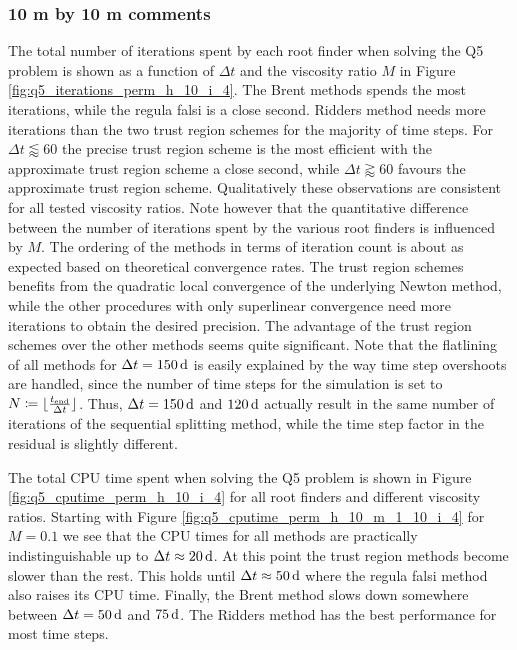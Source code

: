 \subsubsection{10 m by 10 m comments}
The total number of iterations spent by each root finder when solving the Q5 problem is shown as a function of $\Delta t$ and the viscosity ratio $M$ in Figure \ref{fig:q5_iterations_perm_h_10_i_4}. The Brent methods spends the most iterations, while the regula falsi is a close second. Ridders method needs more iterations than the two trust region schemes for the majority of time steps. For $\Delta t \lessapprox 60$ the precise trust region scheme is the most efficient with the approximate trust region scheme a close second, while $\Delta t \gtrapprox 60$ favours the approximate trust region scheme. Qualitatively these observations are consistent for all tested viscosity ratios. Note however that the quantitative difference between the number of iterations spent by the various root finders is influenced by $M$. The ordering of the methods in terms of iteration count is about as expected based on theoretical convergence rates. The trust region schemes benefits from the quadratic local convergence of the underlying Newton method, while the other procedures with only superlinear convergence need more iterations to obtain the desired precision. The advantage of the trust region schemes over the other methods seems quite significant. Note that the flatlining of all methods for $\Delta t = \unit[150]{d}$ is easily explained by the way time step overshoots are handled, since the number of time steps for the simulation is set to $N \coloneqq \lfloor\frac{t_{\text{end}}}{\Delta t}\rfloor$. Thus, $\Delta t = \unit[150]{d}$ and $\unit[120]{d}$ actually result in the same number of iterations of the sequential splitting method, while the time step factor in the residual is slightly different.



The total CPU time spent when solving the Q5 problem is shown in Figure \ref{fig:q5_cputime_perm_h_10_i_4} for all root finders and different viscosity ratios. Starting with Figure \ref{fig:q5_cputime_perm_h_10_m_1_10_i_4} for $M = 0.1$ we see that the CPU times for all methods are practically indistinguishable up to $\Delta t \approx \unit[20]{d}$. At this point the trust region methods become slower than the rest. This holds until $\Delta t \approx \unit[50]{d}$ where the regula falsi method also raises its CPU time. Finally, the Brent method slows down somewhere between $\Delta t = \unit[50]{d}$ and $\unit[75]{d}$. The Ridders method has the best performance for most time steps.

